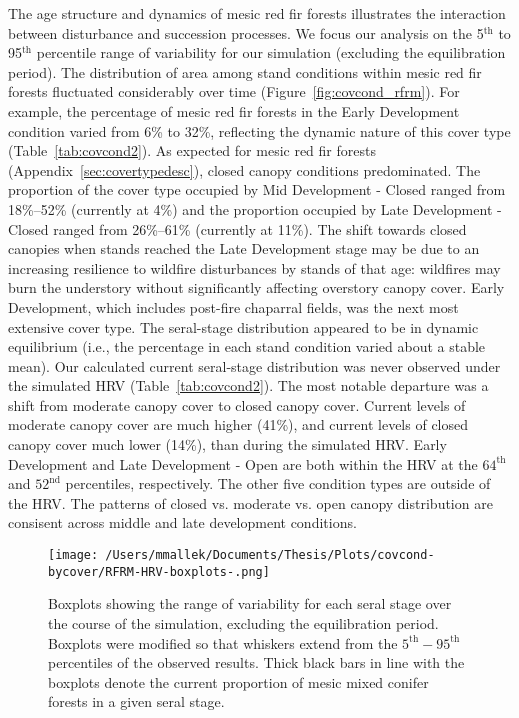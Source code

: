 The age structure and dynamics of mesic red fir forests illustrates the interaction between disturbance and succession processes. We focus our analysis on the 5$^{\text{th}}$ to 95$^{\text{th}}$ percentile range of variability for our simulation (excluding the equilibration period). %
%
The distribution of area among stand conditions within mesic red fir forests fluctuated considerably over time (Figure~\ref{fig:covcond_rfrm}). For example, the percentage of mesic red fir forests in the Early Development condition varied from 6\% to 32\%, reflecting the dynamic nature of this cover type (Table~\ref{tab:covcond2}). As expected for mesic red fir forests (Appendix~\ref{sec:covertypedesc}), closed canopy conditions predominated. The proportion of the cover type occupied by Mid Development - Closed ranged from 18\%--52\% (currently at 4\%) and the proportion occupied by Late Development - Closed ranged from 26\%--61\% (currently at 11\%). The shift towards closed canopies when stands reached the Late Development stage may be due to an increasing resilience to wildfire disturbances by stands of that age: wildfires may burn the understory without significantly affecting overstory canopy cover. Early Development, which includes post-fire chaparral fields, was the next most extensive cover type. %
%
The seral-stage distribution appeared to be in dynamic equilibrium (i.e., the percentage in each stand condition varied about a stable mean). Our calculated current seral-stage distribution was never observed under the simulated HRV (Table~\ref{tab:covcond2}). The most notable departure was a shift from moderate canopy cover to closed canopy cover. Current levels of moderate canopy cover are much higher (41\%), and current levels of closed canopy cover much lower (14\%), than during the simulated HRV. Early Development and Late Development - Open are both within the HRV at the $64^{\text{th}}$ and $52^{\text{nd}}$ percentiles, respectively. The other five condition types are outside of the HRV. The patterns of closed vs. moderate vs. open canopy distribution are consisent across middle and late development conditions.

\begin{figure}[!htbp]
  \centering
    \texttt{[image: /Users/mmallek/Documents/Thesis/Plots/covcond-bycover/RFRM-HRV-boxplots-.png]}
  \caption{Boxplots showing the range of variability for each seral stage over the course of the simulation, excluding the equilibration period. Boxplots were modified so that whiskers extend from the $5^{\text{th}} - 95^{\text{th}}$ percentiles of the observed results. Thick black bars in line with the boxplots denote the current proportion of mesic mixed conifer forests in a given seral stage.} 
  \label{fig:covcond_RFRM_boxplots}
\end{figure}

